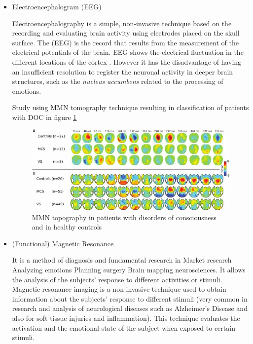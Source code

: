  
\begin{itemize}


\item Electroencephalogram (EEG)

Electroencephalography is a simple, non-invasive technique based on the recording and evaluating brain activity using electrodes placed on the skull surface. The (EEG) is the record that results from the measurement of the electrical potentials of the brain. EEG shows the electrical fluctuation in the different locations of the cortex \cite{Bender2015}. However it has the disadvantage of having an insufficient resolution to register the neuronal activity in deeper brain structures, such as the \textit{nucleus accumbens} related to the processing of emotions\cite{Lang2010}. %

Study using MMN tomography technique resulting in classification of patients with DOC in figure \ref{ferramentaMMN}
\begin{figure}[h!]
\includegraphics[scale=0.7]{figures/MMN-topography-in-patients-with-disorders-of-consciousness-and-in-healthy-controls-The_W640.jpg}
\caption[MMN topography in patients with disorders of consciousness and in healthy controls. The figure shows a comparison of (A) t test maps from Boly et al. (1) for the MMN (comparison of deviant and standard trials) with (B) similar maps obtained from 120 recordings collected in the past three years in Lionel Naccache's laboratory, Hôpital de la Salpêtrière, Paris]{MMN topography in patients with disorders of consciousness and in healthy controls \cite{King2011}
\cite{Boly2011}} %
\label{ferramentaMMN}
\end{figure}

\item  (Functional) Magnetic Resonance

 It is a method of diagnosis and fundamental research in Market research Analyzing emotions Planning surgery Brain mapping neurosciences.\citep{fmri} It allows the analysis of the subjects' response to different activities or stimuli. Magnetic resonance imaging is a non-invasive technique used to obtain information about the subjects' response to different stimuli (very common in research and analysis of neurological diseases such as Alzheimer's Disease and also for soft tissue injuries and inflammation). This technique evaluates the activation and the emotional state of the subject when exposed to certain stimuli. \cite{noauthor_fmri_nodate}
 

\end{itemize}
